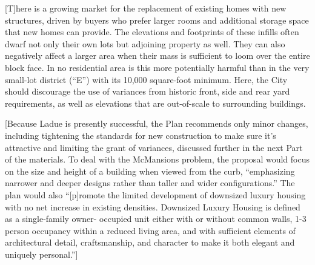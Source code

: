 [T]here is a growing market for the replacement of existing homes with new
structures, driven by buyers who prefer larger rooms and additional storage
space that new homes can provide. The elevations and footprints of these infills
often dwarf not only their own lots but adjoining property as well. They can
also negatively affect a larger area when their mass is sufficient to loom over
the entire block face. In no residential area is this more potentially harmful
than in the very small-lot district (``E'') with its 10,000 square-foot minimum.
Here, the City should discourage the use of variances from historic front, side
and rear yard requirements, as well as elevations that are out-of-scale to
surrounding buildings.

[Because Ladue is presently successful, the Plan recommends only minor changes,
including tightening the standards for new construction to make sure it's
attractive and limiting the grant of variances, discussed further in the next
Part of the materials. To deal with the McMansions problem, the proposal would
focus on the size and height of a building when viewed from the curb,
``emphasizing narrower and deeper designs rather than taller and wider
configurations.'' The plan would also ``[p]romote the limited development of
downsized luxury housing with no net increase in existing densities. Downsized
Luxury Housing is defined as a single-family owner- occupied unit either with or
without common walls, 1-3 person occupancy within a reduced living area, and
with sufficient elements of architectural detail, craftsmanship, and character
to make it both elegant and uniquely personal.'']

